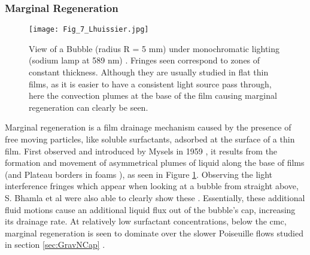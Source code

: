 \documentclass[a4paper,12pt]{article}
\numberwithin{equation}{section}
\numberwithin{figure}{section}
\numberwithin{table}{section}
\begin{document}
\subsubsection{Marginal Regeneration}
\label{sec:marginalReg}

\begin{figure}[!htbp]
    \centering
    \captionsetup{width=.9\linewidth}
    \texttt{[image: Fig\_7\_Lhuissier.jpg]}
    \caption{View of a Bubble (radius R = 5 mm) under monochromatic lighting (sodium lamp at 589 nm) \cite{Lhuissier2011}. Fringes seen correspond to zones of constant thickness. Although they are usually studied in flat thin films, as it is easier to have a consistent light source pass through, here the convection plumes at the base of the film causing marginal regeneration can clearly be seen. }
    \label{fig:Lhuissier7}
\end{figure}

Marginal regeneration is a film drainage mechanism caused by the presence of free moving particles, like soluble surfactants, adsorbed at the surface of a thin film. First observed and introduced by Mysels in 1959 \cite{Mysels1959Book}, it results from the formation and movement of asymmetrical plumes of liquid along the base of films (and Plateau borders in foams \cite{Breward2002}), as seen in Figure \ref{fig:Lhuissier7}. Observing the light interference fringes which appear when looking at a bubble from straight above, S. Bhamla et al were also able to clearly show these \cite{Bhamla2017}. Essentially, these additional fluid motions cause an additional liquid flux out of the bubble's cap, increasing its drainage rate. At relatively low surfactant concentrations, below the cmc, marginal regeneration is seen to dominate over the slower Poiseuille flows studied in section \ref{sec:GravNCap} \cite{Lhuissier2011, Bhamla2017}.
\end{document}
